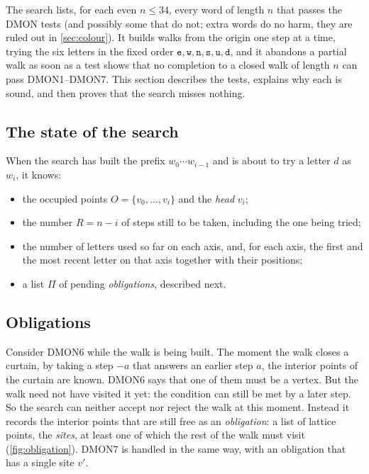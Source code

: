 \documentclass[11pt]{article}
\theoremstyle{plain}
\theoremstyle{definition}
\theoremstyle{remark}
\newcommand{\word}[1]{\texttt{#1}}
\newcommand{\dmon}[1]{\textup{DMON#1}}
\begin{document}
The search lists, for each even $n\le34$, every word of length $n$ that passes the DMON tests (and
possibly some that do not; extra words do no harm, they are ruled out in \cref{sec:colour}). It builds
walks from the origin one step at a time, trying the six letters in the fixed order
$\word{e},\word{w},\word{n},\word{s},\word{u},\word{d}$, and it abandons a partial walk as soon as a test
shows that no completion to a closed walk of length $n$ can pass \dmon1--\dmon7. This section describes
the tests, explains why each is sound, and then proves that the search misses nothing.

\subsection{The state of the search}

When the search has built the prefix $w_0\cdots w_{i-1}$ and is about to try a letter $d$ as $w_i$, it
knows:
\begin{itemize}
\item the occupied points $O=\{v_0,\dots,v_i\}$ and the \emph{head} $v_i$;
\item the number $R=n-i$ of steps still to be taken, including the one being tried;
\item the number of letters used so far on each axis, and, for each axis, the first and the most recent
letter on that axis together with their positions;
\item a list $\Pi$ of pending \emph{obligations}, described next.
\end{itemize}

\subsection{Obligations}\label{sec:obligations}

Consider \dmon6 while the walk is being built. The moment the walk closes a curtain, by taking a step
$-a$ that answers an earlier step $a$, the interior points of the curtain are known. \dmon6 says that
one of them must be a vertex. But the walk need not have visited it yet: the condition can still be
met by a later step. So the search can neither accept nor reject the walk at this moment. Instead it
records the interior points that are still free as an \emph{obligation}: a list of lattice points, the
\emph{sites}, at least one of which the rest of the walk must visit (\cref{fig:obligation}). \dmon7 is
handled in the same way, with an obligation that has a single site $v'$.
\end{document}
